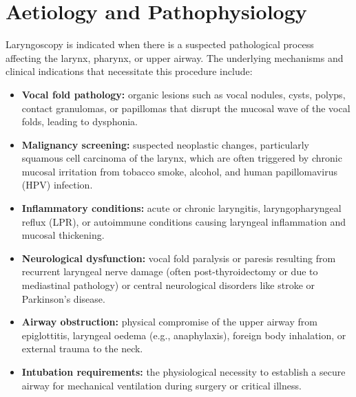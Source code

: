 \section*{Aetiology and Pathophysiology}
Laryngoscopy is indicated when there is a suspected pathological process affecting the larynx, pharynx, or upper airway. The underlying mechanisms and clinical indications that necessitate this procedure include:
\begin{itemize}
    \item \textbf{Vocal fold pathology:} organic lesions such as vocal nodules, cysts, polyps, contact granulomas, or papillomas that disrupt the mucosal wave of the vocal folds, leading to dysphonia.
    \item \textbf{Malignancy screening:} suspected neoplastic changes, particularly squamous cell carcinoma of the larynx, which are often triggered by chronic mucosal irritation from tobacco smoke, alcohol, and human papillomavirus (HPV) infection.
    \item \textbf{Inflammatory conditions:} acute or chronic laryngitis, laryngopharyngeal reflux (LPR), or autoimmune conditions causing laryngeal inflammation and mucosal thickening.
    \item \textbf{Neurological dysfunction:} vocal fold paralysis or paresis resulting from recurrent laryngeal nerve damage (often post-thyroidectomy or due to mediastinal pathology) or central neurological disorders like stroke or Parkinson's disease.
    \item \textbf{Airway obstruction:} physical compromise of the upper airway from epiglottitis, laryngeal oedema (e.g., anaphylaxis), foreign body inhalation, or external trauma to the neck.
    \item \textbf{Intubation requirements:} the physiological necessity to establish a secure airway for mechanical ventilation during surgery or critical illness.
\end{itemize}

